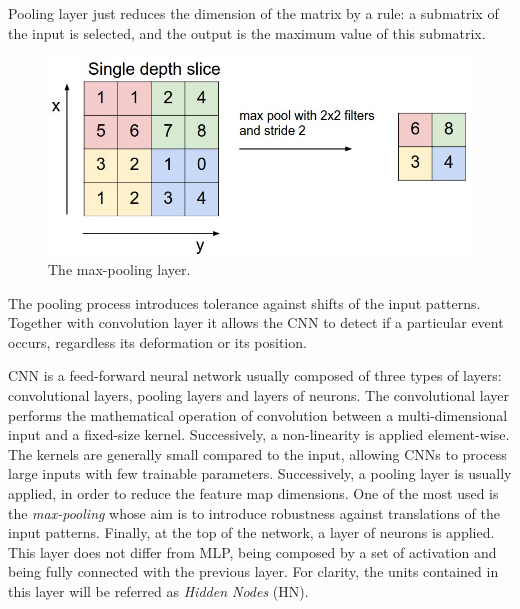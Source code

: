 \begin{enumerate}
	Pooling layer just reduces the dimension of the matrix by a rule: a submatrix of the input is selected, and the output is the maximum value of this submatrix.
	
	\begin{figure}
		\centering
		\includegraphics[width=0.6\columnwidth]{img/maxpool.jpeg}
		\caption{The max-pooling layer.}
	\end{figure}
	
	The pooling process introduces tolerance against shifts of the input patterns. Together with convolution layer it allows the CNN to detect if a particular event occurs, regardless its deformation or its position.
	
	CNN is a feed-forward neural network \cite{lecun1998gradient} usually composed of three types of layers: convolutional layers, pooling layers and layers of neurons.
	The convolutional layer performs the mathematical operation of convolution between a multi-dimensional input and a fixed-size kernel. Successively, a non-linearity is applied element-wise. 
	The kernels are generally small compared to the input, allowing CNNs to process large inputs with few trainable parameters.
	Successively, a pooling layer is usually applied, in order to reduce the feature map dimensions. One of the most used is the \textit{max-pooling} whose aim is to introduce robustness against translations of the input patterns.
	Finally, at the top of the network, a layer of neurons is applied. This layer does not differ from MLP, being composed by a set of activation and being fully connected with the previous layer. For clarity, the units contained in this layer will be referred as \textit{Hidden Nodes} (HN).
	

\end{enumerate}
